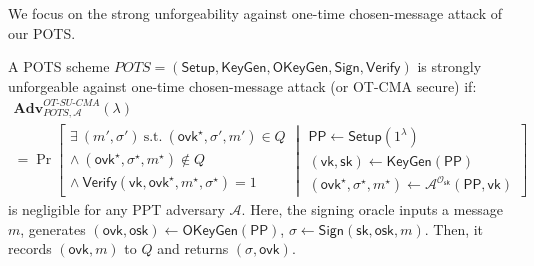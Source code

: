 \documentclass[10pt]{llncs}
\newcommand{\Adv}{\mathbf{Adv}}
\newcommand{\A}{\mathcal{A}}
\newcommand{\sk}{\mathsf{sk}}
\newcommand{\vk}{\mathsf{vk}}
\newcommand{\ovk}{\mathsf{ovk}}
\newcommand{\osk}{\mathsf{osk}}
\newcommand{\Setup}{{\mathsf{Setup}}}
\newcommand{\KeyGen}{{\mathsf{KeyGen}}}
\newcommand{\Verif}{{\mathsf{Verify}}}
\newcommand{\PPP}{\mathsf{PP}}
\begin{document}
We focus on the strong unforgeability against one-time chosen-message attack of our POTS.
\begin{definition}
  A POTS scheme $POTS = (\mathsf{Setup}, \mathsf{KeyGen}, \mathsf{OKeyGen}, \mathsf{Sign}, \mathsf{Verify})$ is strongly unforgeable against   one-time chosen-message attack (or OT-CMA secure) if:
  \begin{multline*}
    \Adv_{POTS, \A}^{OT\textrm{-}SU\textrm{-}CMA}(\lambda) \\ = \Pr \left[
                                            \begin{array}{l}
                                              \exists ~(m',\sigma') ~\mathrm{s.t.}~ (\ovk^\star, \sigma', m')  \in Q \\ \wedge ~ (\ovk^\star, \sigma^\star, m^\star) \not \in Q \\
                                           \wedge  ~    \Verif(\vk, \ovk^\star, m^\star, \sigma^\star) = 1
                                            \end{array}
    \middle|
    \begin{array}{l}
      \PPP \gets \Setup(1^\lambda)\\
      (\vk, \sk) \gets \KeyGen(\PPP)\\
      (\ovk^\star, \sigma^\star, m^\star) \gets \A^{\mathcal{O}_{\sk}} (\PPP,\vk)
    \end{array}
    \right]
  \end{multline*}
  is negligible for any PPT adversary $\A$. Here, the signing oracle inputs a message $m$, 
  generates $(\ovk, \osk) \gets \mathsf{OKeyGen}(\PPP)$, $\sigma \gets \mathsf{Sign}(\sk, \osk, m)$.
  Then, it records $(\ovk, m)$ to $Q$ and returns $(\sigma, \ovk)$.
  
\end{definition}
	
\end{document}
